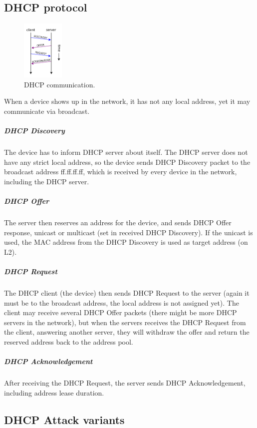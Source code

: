 \documentclass[10pt,a4paper,titlepage]{article}
\begin{document}
\subsection*{DHCP protocol}

\begin{figure}[h!]
    \begin{center}
        \includegraphics[width=0.18\textwidth]{dhcpcomm.png}
        \caption{ DHCP communication. \label{fig:triangle} \cite{DHCPcomm}}
    \end{center}
\end{figure}

When a device shows up in the network, it has not any local address, yet
it may communicate via broadcast.

\subparagraph{DHCP Discovery}
The device has to inform DHCP server about itself. The DHCP server does not have
any strict local address, so the device sends DHCP Discovery packet to the
broadcast address ff.ff.ff.ff, which is received by every device in the
network, including the DHCP server.

\subparagraph{DHCP Offer}
The server then reserves an address for the device, and sends DHCP Offer
response, unicast or multicast (set in received DHCP Discovery). If the
unicast is used, the MAC address from the DHCP Discovery is used as target
address (on L2).

\subparagraph{DHCP Request}
The DHCP client (the device) then sends DHCP Request to the server (again
it must be to the broadcast address, the local address is not assigned yet).
The client may receive several DHCP Offer packets (there might be more DHCP
servers in the network), but when the servers receives the DHCP Request from
the client, answering another server, they will withdraw the offer and return
the reserved address back to the address pool.

\subparagraph{DHCP Acknowledgement}
After receiving the DHCP Request, the server sends DHCP Acknowledgement,
including address lease duration. \cite{mistrovstvivsitich} \cite{DHCPwikipedia}
\cite{IPKDHCP}



\subsection*{DHCP Attack variants}
\end{document}
